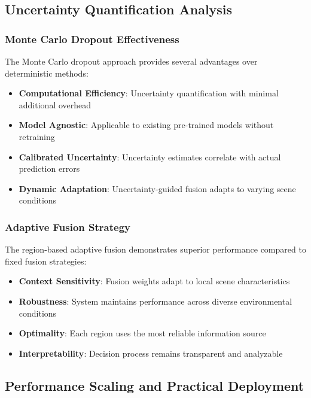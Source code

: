 \documentclass[12pt,oneside]{book}
\begin{document}
\subsection{Uncertainty Quantification Analysis}

\subsubsection{Monte Carlo Dropout Effectiveness}

The Monte Carlo dropout approach provides several advantages over deterministic methods:

\begin{itemize}
\item \textbf{Computational Efficiency}: Uncertainty quantification with minimal additional overhead
\item \textbf{Model Agnostic}: Applicable to existing pre-trained models without retraining
\item \textbf{Calibrated Uncertainty}: Uncertainty estimates correlate with actual prediction errors
\item \textbf{Dynamic Adaptation}: Uncertainty-guided fusion adapts to varying scene conditions
\end{itemize}

\subsubsection{Adaptive Fusion Strategy}

The region-based adaptive fusion demonstrates superior performance compared to fixed fusion strategies:

\begin{itemize}
\item \textbf{Context Sensitivity}: Fusion weights adapt to local scene characteristics
\item \textbf{Robustness}: System maintains performance across diverse environmental conditions
\item \textbf{Optimality}: Each region uses the most reliable information source
\item \textbf{Interpretability}: Decision process remains transparent and analyzable
\end{itemize}

\subsection{Performance Scaling and Practical Deployment}
\end{document}
